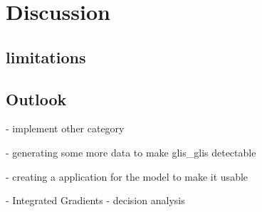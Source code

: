 


\section{Discussion}
\label{discussion}

\subsection{limitations}

\subsection{Outlook}
- implement other category

- generating some more data to make glis\_glis detectable

- creating a application for the model to make it usable

- Integrated Gradients - decision analysis